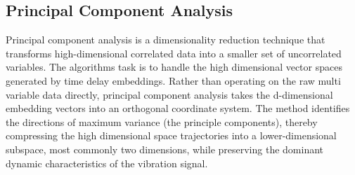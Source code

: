 \subsection{Principal Component Analysis}

Principal component analysis is a dimensionality reduction technique that transforms high-dimensional correlated data into a smaller set of uncorrelated variables.
The algorithms task is to handle the high dimensional vector spaces generated by time delay embeddings. Rather than operating on the raw multi variable data directly, principal component analysis takes the d-dimensional embedding vectors into an orthogonal coordinate system. The method identifies the directions of maximum variance (the principle components), thereby compressing the high dimensional space trajectories into a lower-dimensional subspace, most commonly two dimensions, while preserving the dominant dynamic characteristics of the vibration signal.




